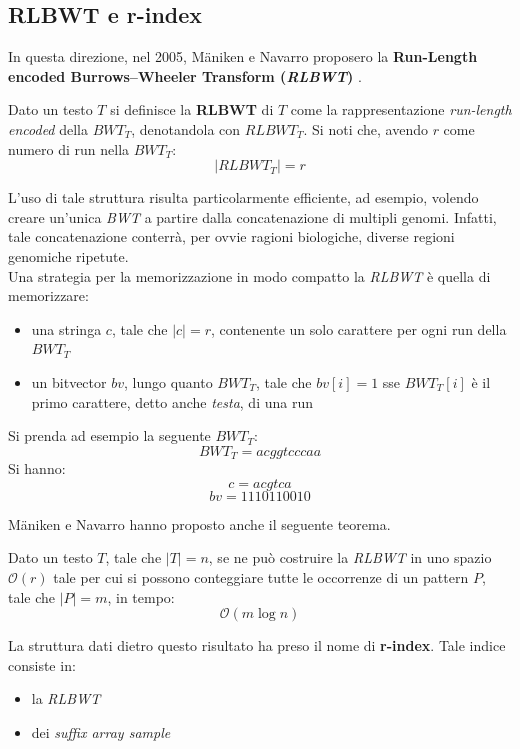 \subsection{RLBWT e r-index}
In questa direzione, nel 2005, M\"{a}niken e Navarro proposero la
\textbf{Run-Length encoded Burrows–Wheeler Transform (\textit{RLBWT})}
\cite{rlbwt}.
\begin{definizione}
  Dato un testo $T$ si definisce la \textbf{RLBWT} di $T$
  come la rappresentazione \textit{run-length encoded} della $BWT_T$,
  denotandola con $RLBWT_T$. Si noti che, avendo $r$ come numero di run nella
  $BWT_T$: 
  \begin{equation}
    \label{eq:rlbwt1}
    |RLBWT_T|=r
  \end{equation}
\end{definizione}
L'uso di tale
struttura risulta particolarmente efficiente, ad esempio, volendo creare
un'unica \textit{BWT} a partire dalla concatenazione di multipli
genomi. Infatti, tale
concatenazione conterrà, per ovvie ragioni biologiche, diverse regioni genomiche
ripetute. \\
Una strategia per la memorizzazione in modo compatto la \textit{RLBWT} è quella
di memorizzare: 
\begin{itemize}
  \item una stringa $c$, tale che $|c|=r$, contenente un solo carattere per ogni
  run della $BWT_T$
  \item un bitvector $bv$, lungo quanto $BWT_T$, tale che $bv[i]=1$ sse
  $BWT_T[i]$ è il primo carattere, detto anche \textit{testa}, di una run 
\end{itemize}
\begin{esempio}
  Si prenda ad esempio la seguente $BWT_T$:
  \[BWT_T=acggtcccaa\]
  Si hanno:
  \[c=acgtca\]
  \[bv=1110110010\]
\end{esempio}
M\"{a}niken e Navarro hanno proposto anche il seguente teorema.
\begin{teorema}
  Dato un testo $T$, tale che $|T|=n$, se ne può costruire la \textit{RLBWT} in
  uno spazio $\mathcal{O}(r)$ tale per cui si possono conteggiare tutte le
  occorrenze di un pattern $P$, tale che $|P|=m$, in tempo:
  \begin{equation}
    \label{eq:rlbwt2}
    \mathcal{O}(m\log n)
  \end{equation}
\end{teorema}
\noindent
La struttura dati dietro questo risultato ha preso il nome di \textbf{r-index}.
Tale indice consiste in: 
\begin{itemize}
  \item la \textit{RLBWT}
  \item dei \textit{suffix array sample}
\end{itemize}
